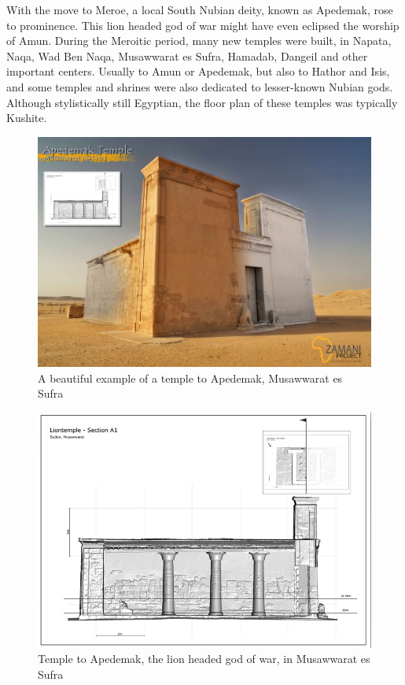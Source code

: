 \documentclass[a4paper,12pt]{scrreprt}
\begin{document}
With the move to Meroe, a local South Nubian deity, known as Apedemak, rose to prominence. This lion headed god of war might have even eclipsed the worship of Amun. During the Meroitic period, many new temples were built, in Napata, Naqa, Wad Ben Naqa, Musawwarat es Sufra, Hamadab, Dangeil and other important centers. Usually to Amun or Apedemak, but also to Hathor and Isis, and some temples and shrines were also dedicated to lesser-known Nubian gods. Although stylistically still Egyptian, the floor plan of these temples was typically Kushite. 

\begin{figure}[H]
	\centering
	\includegraphics[width=\textwidth]{img/temple/apedemak_temple}
	\caption{A beautiful example of a temple to Apedemak, Musawwarat es Sufra}
\end{figure}

\begin{figure}[H]
	\centering
	\includegraphics[width=\textwidth]{img/temple/apedemak_temple_profile}
	\caption{Temple to Apedemak, the lion headed god of war, in Musawwarat es Sufra}
\end{figure}
\end{document}
